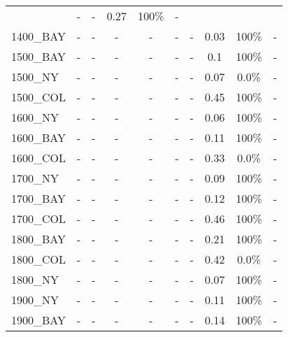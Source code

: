 \documentclass[main.tex]{subfiles}
\begin{document}
\begin{center}
\begin{tabular}{lccccccccc}
 & - & - 
 & 0.27 &  100\%  & - \\
1400\_BAY & - & - 
 & - & - 
 & - & - 
 & 0.03 &  100\%  & - \\
1500\_BAY & - & - 
 & - & - 
 & - & - 
 & 0.1 &  100\%  & - \\
1500\_NY & - & - 
 & - & - 
 & - & - 
 & 0.07 & 0.0\% & - \\
1500\_COL & - & - 
 & - & - 
 & - & - 
 & 0.45 &  100\%  & - \\
1600\_NY & - & - 
 & - & - 
 & - & - 
 & 0.06 &  100\%  & - \\
1600\_BAY & - & - 
 & - & - 
 & - & - 
 & 0.11 &  100\%  & - \\
1600\_COL & - & - 
 & - & - 
 & - & - 
 & 0.33 & 0.0\% & - \\
1700\_NY & - & - 
 & - & - 
 & - & - 
 & 0.09 &  100\%  & - \\
1700\_BAY & - & - 
 & - & - 
 & - & - 
 & 0.12 &  100\%  & - \\
1700\_COL & - & - 
 & - & - 
 & - & - 
 & 0.46 &  100\%  & - \\
1800\_BAY & - & - 
 & - & - 
 & - & - 
 & 0.21 &  100\%  & - \\
1800\_COL & - & - 
 & - & - 
 & - & - 
 & 0.42 & 0.0\% & - \\
1800\_NY & - & - 
 & - & - 
 & - & - 
 & 0.07 &  100\%  & - \\
1900\_NY & - & - 
 & - & - 
 & - & - 
 & 0.11 &  100\%  & - \\
1900\_BAY & - & - 
 & - & - 
 & - & - 
 & 0.14 &  100\%  & - \\
\hline\end{tabular}
\end{center}
\newpage
\end{document}
